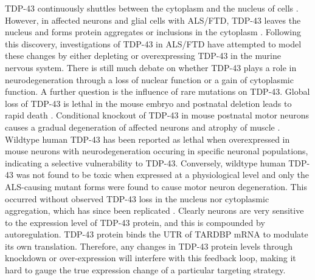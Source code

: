 TDP-43 continuously shuttles between the cytoplasm and the nucleus of cells \citep{Ayala2008}. However, in affected neurons and glial cells with ALS/FTD, TDP-43 leaves the nucleus and forms protein aggregates or inclusions in the cytoplasm \citep{Neumann2006-re}. Following this discovery, investigations of TDP-43 in ALS/FTD have attempted to model these changes by either depleting or overexpressing TDP-43 in the murine nervous system. There is still much debate on whether TDP-43 plays a role in neurodegeneration through a loss of nuclear function or a gain of cytoplasmic function.  A further question is the influence of rare mutations on TDP-43.
Global loss of TDP-43 is lethal in the mouse embryo \citep{Kraemer2010} and postnatal deletion leads to rapid death \citep{Chiang2010}. Conditional knockout of TDP-43 in mouse postnatal motor neurons causes a gradual degeneration of affected neurons and atrophy of muscle \citep{Iguchi2013}. Wildtype human TDP-43 has been reported as lethal when overexpressed in mouse neurons \citep{Shan2010,Wegorzewska2009} with neurodegeneration occuring in specific neuronal populations, indicating a selective vulnerability to TDP-43. Conversely, wildtype human TDP-43 was not found to be toxic when expressed at a physiological level \citep{Arnold2013} and only the ALS-causing mutant forms were found to cause motor neuron degeneration. This occurred without observed TDP-43 loss in the nucleus nor cytoplasmic aggregation, which has since been replicated \citep{Igaz2011}. Clearly neurons are very sensitive to the expression level of TDP-43 protein, and this is compounded by autoregulation. TDP-43 protein binds the UTR of TARDBP mRNA to modulate its own translation\citep{Ayala2011,Koyama2016}. Therefore, any changes in TDP-43 protein levels through knockdown or over-expression will interfere with this feedback loop, making it hard to gauge the true expression change of a particular targeting strategy. 







